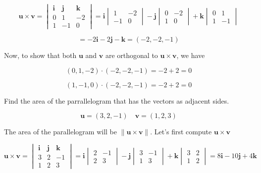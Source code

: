 \documentclass{report}
\begin{document}
$$
\bm{u} \times \bm{v} = \begin{vmatrix} \bm{i} & \bm{j} & \bm{k} \\ 0 & 1 & -2 \\ 1 & -1 & 0 \end{vmatrix} = \bm{i} \begin{vmatrix} 1 & -2 \\ -1 & 0 \end{vmatrix} - \bm{j} \begin{vmatrix} 0 & -2 \\ 1 & 0 \end{vmatrix} + \bm{k} \begin{vmatrix} 0 & 1 \\ 1 & -1 \end{vmatrix}$$

$$
= -2 \bm{i}  - 2 \bm{j} - \bm{k} = (-2,-2,-1)
$$

Now, to show that both $\bm{u}$ and $\bm{v}$ are orthogonal to $\bm{u} \times \bm{v}$, we have

$$
(0,1,-2) \cdot (-2,-2,-1) = -2 + 2 = 0
$$

$$
(1,-1,0) \cdot (-2,-2,-1) = -2 + 2 = 0
$$

\begin{tcolorbox}[colframe = lightred]
	Find the area of the parrallelogram that has the vectors as adjacent sides.
	
	$$
	\bm{u} = (3,2,-1) \quad \bm{v} = (1,2,3)
	$$
\end{tcolorbox}

The area of the parallelogram will be $\| \bm{u} \times \bm{v} \|$. Let's first compute $\bm{u} \times \bm{v}$

$$
\bm{u} \times \bm{v} = \begin{vmatrix} \bm{i} & \bm{j} & \bm{k} \\ 3 & 2 & -1 \\ 1 & 2 & 3 \end{vmatrix} = \bm{i} \begin{vmatrix} 2 & -1 \\ 2 & 3 \end{vmatrix} - \bm{j} \begin{vmatrix} 3 & -1 \\ 1 & 3 \end{vmatrix} + \bm{k} \begin{vmatrix} 3 & 2 \\ 1 & 2 \end{vmatrix} = 8\bm{i} - 10\bm{j} + 4\bm{k}
$$
\end{document}
